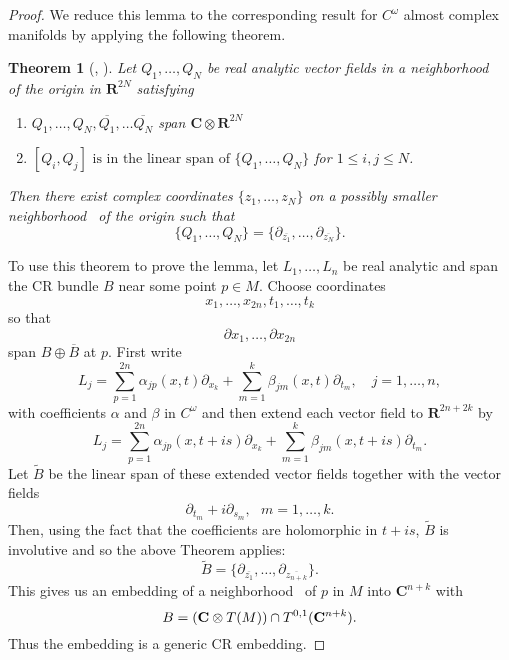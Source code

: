 \documentclass{amsart}
\newtheorem{theorem}{Theorem}[section]
\begin{document}
\begin{proof} 
We reduce this lemma to the corresponding result for $C^\omega$ almost
complex manifolds by applying the following theorem.

\begin{theorem}[\cite{EF}, \cite{Li}]
Let $Q_1, \ldots ,Q_N$ be real analytic vector fields in a {neighborhood\ } of
the origin in  ${\mathbf{R}} ^{2N}$ satisfying
\begin{enumerate}

\item $Q_1,\ldots ,Q_N, \overline {Q_1},\ldots \overline{Q_N}$ span
  ${\mathbf{C}}\otimes {\mathbf{R}} ^{2N}$

\item 
$[Q_i, Q_j] \mbox{ is in the linear span of } \{ Q_1, \ldots , Q_N\}$ \quad
for $1 \leq i,j \leq N$.
 
\end{enumerate}
Then there exist complex coordinates $\{ z_1, \ldots , z_N\}$ on a
possibly smaller {neighborhood\ } of the origin such that 
\[
 \{ Q_1, \ldots , Q_N\} = \{ \partial _{\overline{z_1}}, \ldots ,
 \partial _{\overline{z_N}}\} .
\]
\end{theorem}

To use this theorem to prove the lemma, let $L_1, \ldots , L_n$ be real
analytic and span the CR bundle $B$ near some point $p\in M$.  Choose
coordinates
\[
x_1, \ldots , x_{2n}, t_1, \ldots , t_k
\]
so that 
\[ 
\partial 
x_1, \ldots ,\partial  x_{2n}
\]
span $B \oplus \overline{B} $ at $p$. First write
\[
L_j= \sum_{p=1}^{2n} \alpha _{jp}(x,t)\partial _{x_k} +\sum_{m=1}^k
\beta _{jm}(x,t)\partial _{t_m}, \quad j=1, \ldots, n,
\]
with coefficients $\alpha$ and $\beta$ in $C^\omega$ 
and then extend each vector field to ${\mathbf{R}} ^{2n+2k}$ by
\[
L_j= \sum_{p=1}^{2n} \alpha _{jp}(x,t+is)\partial _{x_k} +\sum_{m=1}^k
\beta _{jm}(x,t+is)\partial _{t_m}.
\]
Let  $\widetilde{B}$ be the linear span of these extended vector fields
together with the vector fields
\[
\partial _{t_m} +i \partial _{s_m}, \ \ \ m= 1, \ldots , k.
\]
Then, using the fact that the coefficients are holomorphic in $t+is$, 
$\widetilde{B}$ is involutive and so the above
Theorem applies:
\[
\widetilde{B}= \{  \partial _{\overline{z_1}}, \ldots ,
 \partial _{\overline{z_{n+k}} }\}.
\]
This gives us an embedding of a {neighborhood\ } of $p$ in $M$ into ${\mathbf{C}} ^{n+k}$
with
\[
B=( {{\bf{C}}\otimes T(M)} )\cap {T^{0,1}} ({\mathbf{C}} ^{n+k}).
\]
Thus the embedding is a generic CR embedding.


\end{proof}
\end{document}
